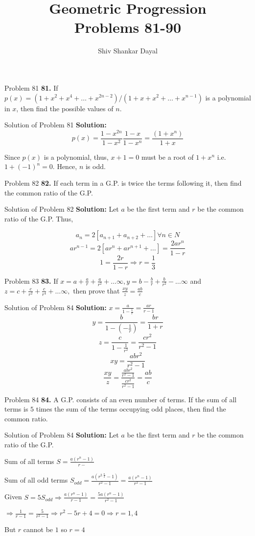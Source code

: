 \documentclass[aspectratio=1610,8pt]{beamer}
\title{Geometric Progression\\Problems 81-90}
\author[Shiv Shankar Dayal]{Shiv Shankar Dayal}
\begin{document}
\begin{frame}
  \titlepage
\end{frame}
\begin{frame}{Problem 81}
  \textbf{81.} If $p(x) = (1 + x^2 + x^4 + \ldots + x^{2n - 2})/(1 + x + x^2 + \ldots + x^{n - 1})$ is a polynomial in $x$, then
  find the possible values of $n.$
\end{frame}
\begin{frame}{Solution of Problem 81}
  \textbf{Solution:} $$p(x) = \frac{1 - x^{2n}}{1 - x^2}\frac{1 - x}{1 - x^n} = \frac{(1 + x^n)}{1 + x}$$

  Since $p(x)$ is a polynomial, thus, $x + 1 = 0$ must be a root of $1 + x^n$ i.e. $1 + (-1)^n = 0.$ Hence, $n$ is odd.
\end{frame}
\begin{frame}{Problem 82}
  \textbf{82.} If each term in a G.P. is twice the terms following it, then find the common ratio of the G.P.
\end{frame}
\begin{frame}{Solution of Problem 82}
  \textbf{Solution:} Let $a$ be the first term and $r$ be the common ratio of the G.P. Thus,

  $$a_n = 2[a_{n + 1} + a_{n + 2} + \ldots ]\forall n\in N$$
  $$ar^{n - 1} = 2[ar^n + ar^{n + 1} + \ldots] = \frac{2ar^n}{1 - r}$$
  $$1 = \frac{2r}{1 - r}\Rightarrow r = \frac{1}{3}$$
\end{frame}
\begin{frame}{Problem 83}
  \textbf{83.} If $x = a + \frac{a}{r} + \frac{a}{r^2} + \ldots \infty, y = b - \frac{b}{r} + \frac{b}{r^2} - \ldots \infty$ and $z
  = c + \frac{c}{r^2} + \frac{c}{r^4} + \ldots \infty,$ then prove that $\frac{xy}{z} = \frac{ab}{c}$
\end{frame}
\begin{frame}{Solution of Problem 84}
  \textbf{Solution:} $x = \frac{a}{1 - \frac{1}{r}} = \frac{ar}{r - 1}$
  $$y = \frac{b}{1 - \left(-\frac{1}{r}\right)} = \frac{br}{1 + r}$$
  $$z = \frac{c}{1 - \frac{1}{r^2}} = \frac{cr^2}{r^2 - 1}$$
  $$xy = \frac{abr^2}{r^2 - 1}$$
  $$\frac{xy}{z} = \frac{\frac{abr^2}{r^2 - 1}}{\frac{cr^2}{r^2 - 1}} = \frac{ab}{c}$$
\end{frame}
\begin{frame}{Problem 84}
  \textbf{84.} A G.P. consists of an even number of terms. If the sum of all terms is $5$ times the sum of the terms occupying odd
  places, then find the common ratio.
\end{frame}
\begin{frame}{Solution of Problem 84}
  \textbf{Solution:} Let $a$ be the first term and $r$ be the common ratio of the G.P.

  Sum of all terms $S = \frac{a(r^n - 1)}{r - }$

  Sum of all odd terms $S_{odd} = \frac{a(r^{2.\frac{n}{2}} - 1)}{r^2 - 1} = \frac{a(r^n - 1)}{r^2 - 1}$

  Given $S = 5S_{odd}\Rightarrow \frac{a(r^n - 1)}{r - 1} = \frac{5a(r^n - 1)}{r^2 - 1}$

  $\Rightarrow \frac{1}{r - 1} = \frac{5}{r^2 - 1}\Rightarrow r^2 - 5r + 4 = 0\Rightarrow r = 1, 4$

  But $r$ cannot be $1$ so $r = 4$
\end{frame}
\end{document}

